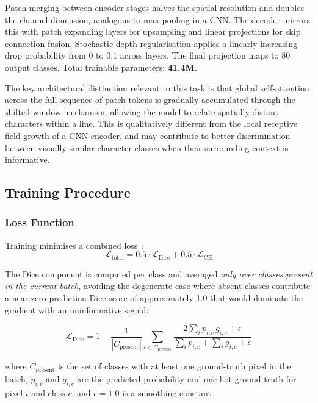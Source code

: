 \documentclass[a4paper,11pt]{article}
\begin{document}
Patch merging between encoder stages halves the spatial resolution and doubles the
channel dimension, analogous to max pooling in a CNN. The decoder mirrors this with patch
expanding layers for upsampling and linear projections for skip connection fusion.
Stochastic depth regularisation applies a linearly increasing drop probability from 0 to
0.1 across layers. The final projection maps to 80 output classes. Total trainable
parameters: \textbf{41.4M}.

The key architectural distinction relevant to this task is that global self-attention
across the full sequence of patch tokens is gradually accumulated through the
shifted-window mechanism, allowing the model to relate spatially distant characters within
a line. This is qualitatively different from the local receptive field growth of a CNN
encoder, and may contribute to better discrimination between visually similar character
classes when their surrounding context is informative.

\subsection{Training Procedure}

\subsubsection{Loss Function}

Training minimises a combined loss~\cite{sudre2017}:
\begin{equation}
    \mathcal{L}_{\text{total}} = 0.5 \cdot \mathcal{L}_{\text{Dice}}
    + 0.5 \cdot \mathcal{L}_{\text{CE}}
    \label{eq:loss}
\end{equation}

The Dice component is computed per class and averaged \emph{only over classes present in
the current batch}, avoiding the degenerate case where absent classes contribute a
near-zero-prediction Dice score of approximately 1.0 that would dominate the gradient
with an uninformative signal:

\begin{equation}
    \mathcal{L}_{\text{Dice}} = 1 - \frac{1}{|C_{\text{present}}|}
    \sum_{c \in C_{\text{present}}}
    \frac{2\displaystyle\sum_i p_{i,c}\, g_{i,c} + \epsilon}
         {\displaystyle\sum_i p_{i,c} + \sum_i g_{i,c} + \epsilon}
    \label{eq:dice}
\end{equation}

where $C_{\text{present}}$ is the set of classes with at least one ground-truth pixel in
the batch, $p_{i,c}$ and $g_{i,c}$ are the predicted probability and one-hot ground
truth for pixel $i$ and class $c$, and $\epsilon = 1.0$ is a smoothing constant.
\end{document}
